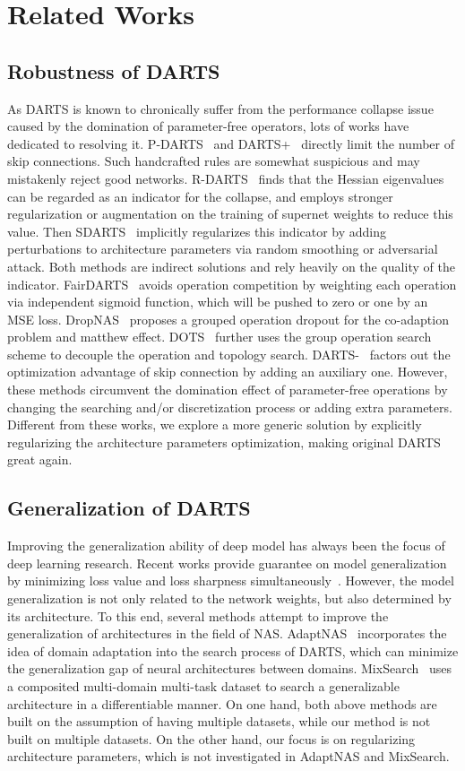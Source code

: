 \documentclass[10pt,twocolumn,letterpaper]{article}
\begin{document}
\section{Related Works} \label{sec:related work}
\subsection{Robustness of DARTS}
As DARTS is known to chronically suffer from the performance collapse issue caused by the domination of parameter-free operators, lots of works have dedicated to resolving it. P-DARTS~\cite{pdarts} and DARTS+~\cite{darts+} directly limit the number of skip connections. Such handcrafted rules are somewhat suspicious and may mistakenly reject good networks. R-DARTS~\cite{rdarts} finds that the Hessian eigenvalues can be regarded as an indicator for the collapse, and employs stronger regularization or augmentation on the training of supernet weights to reduce this value. Then SDARTS~\cite{sdarts} implicitly regularizes this indicator by adding perturbations to architecture parameters via random smoothing or adversarial attack. Both methods are indirect solutions and rely heavily on the quality of the indicator. FairDARTS~\cite{fairdarts} avoids operation competition by weighting each operation via independent sigmoid function, which will be pushed to zero or one by an MSE loss. DropNAS~\cite{dropnas} proposes a grouped operation dropout for the co-adaption problem and matthew effect. DOTS~\cite{dots} further uses the group operation search scheme to decouple the operation and topology search. DARTS-~\cite{darts-} factors out the optimization advantage of skip connection by adding an auxiliary one. However, these methods circumvent the domination effect of parameter-free operations by changing the searching and/or discretization process or adding extra parameters. Different from these works, we explore a more generic solution by explicitly regularizing the architecture parameters optimization, making original DARTS great again.
\subsection{Generalization of DARTS}
Improving the generalization ability of deep model has always been the focus of deep learning research. Recent works provide guarantee on model generalization by minimizing loss value and loss sharpness simultaneously~\cite{foret2020sharpness}. However, the model generalization is not only related to the network weights, but also determined by its architecture. To this end, several methods attempt to improve the generalization of architectures in the field of NAS. AdaptNAS~\cite{adaptNAS} incorporates the idea of domain adaptation into the search process of DARTS, which can minimize the generalization gap of neural architectures between domains. MixSearch~\cite{mixsearch} uses a composited multi-domain multi-task dataset to search a generalizable architecture in a differentiable manner. On one hand, both above methods are built on the assumption of having multiple datasets, while our method is not built on multiple datasets. On the other hand, our focus is on regularizing architecture parameters, which is not investigated in AdaptNAS and MixSearch.
\end{document}
